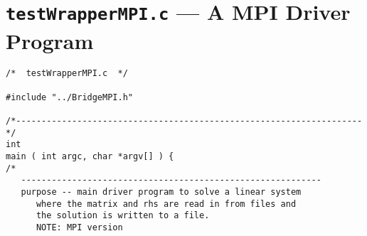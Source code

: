 \chapter{{\tt testWrapperMPI.c} --- A MPI Driver Program}
\label{chapter:MPI_driver}

\begin{verbatim}
/*  testWrapperMPI.c  */

#include "../BridgeMPI.h"

/*--------------------------------------------------------------------*/
int
main ( int argc, char *argv[] ) {
/*
   -----------------------------------------------------------
   purpose -- main driver program to solve a linear system
      where the matrix and rhs are read in from files and
      the solution is written to a file.
      NOTE: MPI version


\end{verbatim}
